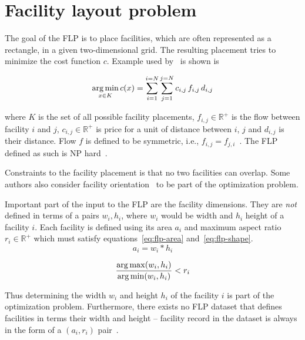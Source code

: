 \section{Facility layout problem}\label{sec:facility-layout-problem}

The goal of the FLP is to place facilities, which are often represented as a rectangle,
in a given two-dimensional grid. The resulting placement tries to minimize
the cost function $c$.
Example used by~\cite{goncalvesBiasedRandomkeyGenetic2015} is shown is

\begin{equation}
    \operatorname*{arg\,min}_{x \in K} c(x) = \sum\limits_{i=1}^{i=N}\sum\limits_{j=1}^{j=N}c_{i,j}\,f_{i,j}\,d_{i,j}
    \label{eq:flp-objective}
\end{equation}

where $K$ is the set of all possible facility placements, $f_{i,j} \in \mathbb{R^+}$ is the flow between facility $i$ and $j$, $c_{i,j} \in \mathbb{R^+}$
is price for a unit of distance between $i$, $j$ and $d_{i,j}$ is their distance.
Flow $f$ is defined to be symmetric, i.e., $f_{i,j} = f_{j,i}$~\cite{goncalvesBiasedRandomkeyGenetic2015, dunkerCoevolutionaryAlgorithmFacility2003}.
The FLP defined as such is NP hard~\cite{liuMultiobjectiveParticleSwarm2018, goncalvesBiasedRandomkeyGenetic2015, friedrichIntegratedSlicingTree2018}.

Constraints to the facility placement is that no two facilities can overlap.
Some authors also consider facility orientation~\cite{liuMultiobjectiveParticleSwarm2018, tamHierarchicalApproachFacility1991}
to be part of the optimization problem.

Important part of the input to the FLP are the facility dimensions.
They are \textit{not} defined in terms of a pairs $w_i, h_i$, where $w_i$ would be width and $h_i$ height of a facility $i$.
Each facility is defined using its area $a_i$ and maximum aspect ratio $r_i \in \mathbb{R^+}$ which must satisfy equations~\ref{eq:flp-area} and~\ref{eq:flp-shape}.
\begin{equation}
    a_i = w_i * h_i
    \label{eq:flp-area}
\end{equation}

\begin{equation}
    \dfrac{\operatorname*{arg\,max}(w_i, h_i)}{\operatorname*{arg\,min}(w_i, h_i)} < r_i
    \label{eq:flp-shape}
\end{equation}

Thus determining the width $w_i$ and height $h_i$ of the facility $i$ is part of the optimization problem.
Furthermore, there exists no FLP dataset that defines facilities in terms their width and height
– facility record in the dataset is always in the form of a $(a_i, r_i)$ pair~\cite{tamHierarchicalApproachFacility1991, dunkerCoevolutionaryAlgorithmFacility2003, liuSequencepairRepresentationMIPmodelbased2007}.

